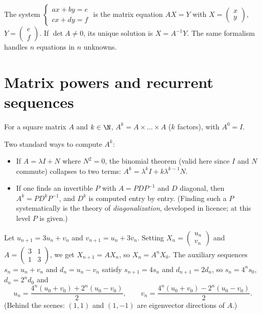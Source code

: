 \begin{method}\label{met:tle:matrix:systems}
The system
$\begin{cases} ax + by = e\\ cx + dy = f \end{cases}$
is the matrix equation $AX = Y$ with
$X = \begin{pmatrix} x \\ y\end{pmatrix}$,
$Y = \begin{pmatrix} e \\ f\end{pmatrix}$. If $\det A \neq 0$, its unique
solution is $X = A^{-1}Y$. The same formalism handles $n$ equations in $n$
unknowns.
\end{method}

\section{Matrix powers and recurrent sequences}

\begin{definition}\label{def:tle:matrix:power}
For a square matrix $A$ and $k \in \N$, $A^k = A \times \dots \times A$
($k$ factors), with $A^0 = I$.
\end{definition}

\begin{method}\label{met:tle:matrix:powers}
Two standard ways to compute $A^k$:
\begin{itemize}
  \item If $A = \lambda I + N$ where $N^2 = 0$, the binomial theorem
        (valid here since $I$ and $N$ commute) collapses to two terms:
        $A^k = \lambda^k I + k \lambda^{k-1} N$.
  \item If one finds an invertible $P$ with $A = PDP^{-1}$ and $D$ diagonal,
        then $A^k = P D^k P^{-1}$, and $D^k$ is computed entry by entry.
        (Finding such a $P$ systematically is the theory of
        \emph{diagonalization}, developed in licence; at this level $P$ is
        given.)
\end{itemize}
\end{method}

\begin{example}\label{ex:tle:matrix:coupled}
Let $u_{n+1} = 3u_n + v_n$ and $v_{n+1} = u_n + 3v_n$. Setting
$X_n = \begin{pmatrix} u_n\\ v_n \end{pmatrix}$ and
$A = \begin{pmatrix} 3 & 1\\ 1 & 3\end{pmatrix}$, we get
$X_{n+1} = AX_n$, so $X_n = A^n X_0$. The auxiliary sequences
$s_n = u_n + v_n$ and $d_n = u_n - v_n$ satisfy $s_{n+1} = 4s_n$ and
$d_{n+1} = 2d_n$, so $s_n = 4^n s_0$, $d_n = 2^n d_0$ and
\[
u_n = \frac{4^n(u_0+v_0) + 2^n(u_0-v_0)}{2}, \qquad
v_n = \frac{4^n(u_0+v_0) - 2^n(u_0-v_0)}{2}.
\]
(Behind the scenes: $(1,1)$ and $(1,-1)$ are eigenvector directions of $A$.)
\end{example}

